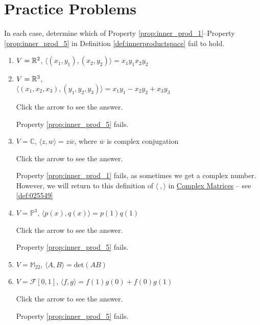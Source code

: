 \documentclass{ximera}
\begin{document}
\section*{Practice Problems}

\begin{problem}\label{prob:inner_prod_1}
In each case, determine which of  Property \ref{prop:inner_prod_1}--Property \ref{prop:inner_prod_5} in Definition \ref{def:innerproductspace} fail to hold.

\begin{enumerate} 
\item $V = \mathbb{R}^2$, $\langle (x_1, y_1), (x_2, y_2) \rangle = x_1y_1x_2y_2$

\item $V = \mathbb{R}^3$, \\$\langle (x_1, x_2, x_3), (y_1, y_2, y_3) \rangle = x_1y_1 - x_2y_2 + x_3y_3$

Click the arrow to see the answer.
\begin{expandable}
Property \ref{prop:inner_prod_5} fails.
\end{expandable}

\item $V = \mathbb{C}$, $\langle z, w \rangle = z\overline{w}$, where $\overline{w}$ is complex
conjugation

Click the arrow to see the answer.
\begin{expandable}
Property \ref{prop:inner_prod_1} fails, as sometimes we get a complex number.  However, we will return to this definition of $\langle\ , \rangle$ in \href{https://ximera.osu.edu/oerlinalg/LinearAlgebra/RTH-0050/main}{Complex Matrices} -- see \ref{def:025549}
\end{expandable}

\item $V = \mathbb{P}^3$, $\langle p(x), q(x) \rangle = p(1)q(1)$

Click the arrow to see the answer.
\begin{expandable}
Property \ref{prop:inner_prod_5} fails.
\end{expandable}

\item $V = \mathbb{M}_{22}$, $\langle A, B \rangle = \mbox{det}(AB)$

\item $V = \mathcal{F}[0, 1]$, $\langle f, g \rangle = f(1)g(0) + f(0)g(1)$

Click the arrow to see the answer.
\begin{expandable}
Property \ref{prop:inner_prod_5} fails.
\end{expandable}

\end{enumerate}
\end{problem}
\end{document}
